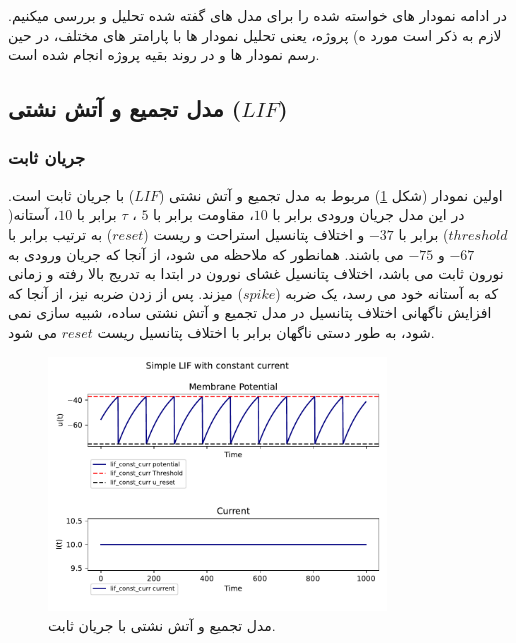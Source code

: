 \documentclass{article}
\begin{document}
        در ادامه نمودار های خواسته شده را برای مدل های گفته شده تحلیل و بررسی میکنیم. لازم به ذکر است مورد 
        ه) 
        پروژه، یعنی تحلیل نمودار ها با پارامتر های مختلف، در حین رسم نمودار ها و در روند بقیه پروژه انجام شده است.

        \subsection{مدل تجمیع و آتش نشتی ($LIF$)}
            \subsubsection{جریان ثابت}
            اولین نمودار
            (شکل \ref{fig:lif-const-curr})
            مربوط به مدل تجمیع و آتش نشتی
            ($LIF$) 
            با جریان ثابت است. در این مدل جریان ورودی برابر با 
            $10$، 
            مقاومت برابر با 
            $5$ ، 
            $\tau$ 
            برابر با 
            $10$،  
            آستانه($threshold$) 
            برابر با 
            $-37$ 
            و اختلاف پتانسیل استراحت و ریست
            ($reset$) 
            به ترتیب برابر با 
            $-67$ و
            $-75$ 
            می باشند. همانطور که ملاحظه می شود، از آنجا که جریان ورودی به نورون ثابت می باشد، اختلاف پتانسیل غشای نورون در ابتدا به تدریج بالا رفته و زمانی که به آستانه خود می رسد، یک ضربه
            ($spike$) 
            میزند. پس از زدن ضربه نیز، از آنجا که افزایش ناگهانی اختلاف پتانسیل در مدل تجمیع و آتش نشتی ساده، شبیه سازی نمی شود، به طور دستی ناگهان برابر با اختلاف پتانسیل ریست
            $reset$ 
            می شود.

            \begin{figure}[H]
                \centering
                \includegraphics[width=0.8\textwidth]{plots/Simple LIF with constant current.pdf} %
                \caption{مدل تجمیع و آتش نشتی با جریان ثابت.}
                \label{fig:lif-const-curr}
            \end{figure}
\end{document}

